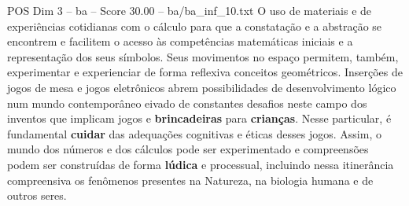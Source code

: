 \begin{textsample}{POS Dim 3 – ba – Score 30.00 – ba/ba\_inf\_10.txt}
O uso de materiais e de experiências cotidianas com o cálculo para que a constatação e a abstração se encontrem e facilitem o acesso às competências matemáticas iniciais e a representação dos seus símbolos.
Seus movimentos no espaço permitem, também, experimentar e experienciar de forma reflexiva conceitos geométricos.
Inserções de jogos de mesa e jogos eletrônicos abrem possibilidades de desenvolvimento lógico num mundo contemporâneo eivado de constantes desafios neste campo dos inventos que implicam jogos e \textbf{brincadeiras} para \textbf{crianças}.
Nesse particular, é fundamental \textbf{cuidar} das adequações cognitivas e éticas desses jogos.
Assim, o mundo dos números e dos cálculos pode ser experimentado e compreensões podem ser construídas de forma \textbf{lúdica} e processual, incluindo nessa itinerância compreensiva os fenômenos presentes na Natureza, na biologia humana e de outros seres.

\end{textsample}
